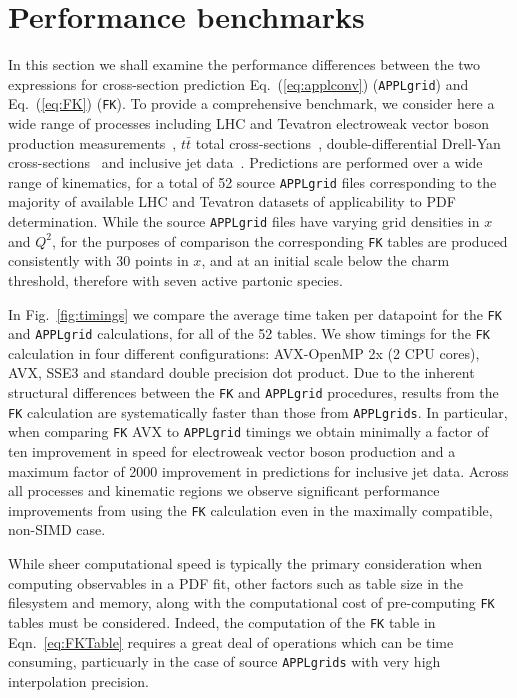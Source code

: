 \documentclass[preprint,12pt]{elsarticle}
\begin{document}
\section{Performance benchmarks}
\label{sec:benchmark}

In this section we shall examine the performance
differences between the two expressions for cross-section prediction
Eq.~(\ref{eq:applconv}) ({\tt APPLgrid}) and Eq.~(\ref{eq:FK}) ({\tt FK}).
%
To provide a comprehensive benchmark, we consider here a wide range of
processes including LHC and Tevatron electroweak vector boson
production
measurements~\cite{Aaij:2012mda,Aaij:2012vn,Chatrchyan:2013mza,Chatrchyan:2013uja,Chatrchyan:2012xt,Aad:2013iua,Aad:2011fp,Aad:2011dm,Aaltonen:2010zza},
$t\bar{t}$ total
cross-sections~\cite{ATLAS:2012aa,ATLAS:2011xha,TheATLAScollaboration:2013dja,Chatrchyan:2013faa,Chatrchyan:2012bra,Chatrchyan:2012ria},
double-differential Drell-Yan
cross-sections~\cite{Chatrchyan:2013tia,CMS:2014jea} and inclusive jet
data~\cite{Chatrchyan:2012bja,Aad:2011fc,Aad:2013lpa,Abazov:2007jy}. Predictions
are performed over a wide range of kinematics, for a total of 52 source
{\tt APPLgrid} files corresponding to the majority of available LHC and Tevatron datasets of applicability to PDF determination.
While the source {\tt APPLgrid} files have varying grid densities in $x$ and $Q^2$, for the purposes of comparison the corresponding {\tt FK} tables are produced
consistently with 30 points in $x$, and at an initial scale below the charm threshold, therefore with seven active partonic species.

In Fig.~\ref{fig:timings} we compare the average time taken per datapoint
for the {\tt FK} and {\tt APPLgrid} calculations, for all of the 52
tables. We show timings for the {\tt FK} calculation in four
different configurations: AVX-OpenMP 2x (2 CPU cores), AVX, SSE3 and
standard double precision dot product. Due to the inherent structural differences between the {\tt FK} and {\tt APPLgrid} procedures,
results from the {\tt FK} calculation are systematically faster than those from {\tt APPLgrids}.
In particular, when comparing {\tt FK} AVX to {\tt APPLgrid} timings we obtain minimally a factor
of ten improvement in speed for electroweak vector boson production and
a maximum factor of 2000 improvement in predictions for inclusive jet data. Across all processes
and kinematic regions we observe significant performance improvements from using the {\tt FK} calculation
even in the maximally compatible, non-SIMD case.

While sheer computational speed is typically the primary consideration when computing observables
in a PDF fit, other factors such as table size in the filesystem and memory, along with the computational cost of
pre-computing {\tt FK} tables must be considered. Indeed, the computation of the {\tt FK} table in Eqn.~\ref{eq:FKTable}
requires a great deal of operations which can be time consuming, particuarly in the case of source {\tt APPLgrids} with very high
interpolation precision.
\end{document}
